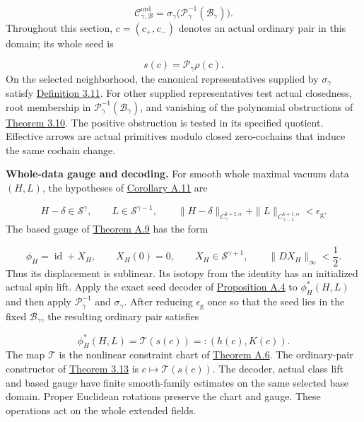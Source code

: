 \documentclass[
  english,
  11pt,
  reqno]{amsart}
\begin{document}
\label{eq:submission-selected-ordinary-domain} \[
\mathscr C^{\mathrm{ord}}_{\gamma,\mathcal B}
=
\sigma_\gamma\bigl(\mathscr P_\gamma^{-1}
(\mathcal B_\gamma)\bigr).
\] Throughout this section, \(c=(c_+,c_-)\) denotes an actual ordinary
pair in this domain; its whole seed is

\label{eq:submission-ordinary-seed-readout} \[
s(c)=\mathscr P_\gamma\rho(c).
\] On the selected neighborhood, the canonical representatives supplied
by \(\sigma_\gamma\) satisfy
\hyperref[def:online-effective-ordinary-cochain-domain]{Definition
3.11}. For other supplied representatives test actual closedness, root
membership in \(\mathscr P_\gamma^{-1}(\mathcal B_\gamma)\), and
vanishing of the polynomial obstructions of
\hyperref[thm:online-actual-cochain-obstruction-test]{Theorem 3.10}. The
positive obstruction is tested in its specified quotient. Effective
arrows are actual primitives modulo closed zero-cochains that induce the
same cochain change.

\textbf{Whole-data gauge and decoding.} For smooth whole maximal vacuum
data \((H,L)\), the hypotheses of
\hyperref[cor:online-gauge-whole-data-decoding]{Corollary A.11} are

\label{eq:submission-whole-gauge-domain} \[
H-\delta\in\mathscr S^\gamma,\qquad
L\in\mathscr S^{\gamma-1},\qquad
\|H-\delta\|_{C^{k+2,\alpha}_\gamma}
+\|L\|_{C^{k+1,\alpha}_{\gamma-1}}<\epsilon_{\mathrm g}.
\] The based gauge of
\hyperref[thm:online-gauge-based-normalization]{Theorem A.9} has the
form

\label{eq:submission-based-gauge} \[
\phi_H=\operatorname{id}+X_H,\qquad
X_H(0)=0,\qquad
X_H\in\mathscr S^{\gamma+1},\qquad
\|DX_H\|_\infty<\frac12.
\] Thus its displacement is sublinear. Its isotopy from the identity has
an initialized actual spin lift. Apply the exact seed decoder of
\hyperref[prop:online-chart-exact-ambient-decoder]{Proposition A.4} to
\(\phi_H^*(H,L)\) and then apply \(\mathscr P_\gamma^{-1}\) and
\(\sigma_\gamma\). After reducing \(\epsilon_{\mathrm g}\) once so that
the seed lies in the fixed \(\mathcal B_\gamma\), the resulting ordinary
pair satisfies

\label{eq:submission-coverage-decoder-input} \[
\phi_H^*(H,L)=\mathcal T(s(c))
=:(h(c),K(c)).
\] The map \(\mathcal T\) is the nonlinear constraint chart of
\hyperref[thm:online-chart-base-constraint-bijection]{Theorem A.6}. The
ordinary-pair constructor of
\hyperref[thm:online-ordinary-pair-data-bijection]{Theorem 3.13} is
\(c\mapsto\mathcal T(s(c))\). The decoder, actual class lift and based
gauge have finite smooth-family estimates on the same selected base
domain. Proper Euclidean rotations preserve the chart and gauge. These
operations act on the whole extended fields.
\end{document}

